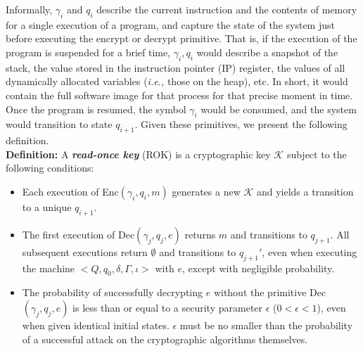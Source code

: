 Informally, $\gamma_i$ and $q_i$ describe the current instruction and the contents of memory for a single execution
of a program, and capture the state of the system just before executing the encrypt or decrypt primitive.  That is,
if the execution of the program is suspended for a brief time, $\gamma_i,q_i$ would describe a snapshot of the
stack, the value stored in the instruction pointer (IP) register, the values of all dynamically allocated
variables (\emph{i.e.,} those on the heap), etc.  In short, it would contain the full software image for that
process for that precise moment in time.  Once the program is resumed, the symbol $\gamma_i$ would be consumed, and
the system would transition to state $q_{i+1}$.  Given these primitives, we present the following definition. \\

\noindent \textbf{Definition:}  A \emph{\bf read-once key} (ROK) is a cryptographic key $\mathcal{K}$ subject
to the following conditions:
\begin{itemize}
\item Each execution of {\sf Enc}$(\gamma_i,q_i,m)$ generates a new $\mathcal{K}$ and yields a transition to a unique $q_{i+1}$.
\item The first execution of {\sf Dec}$(\gamma_j,q_j,e)$ returns $m$ and transitions to $q_{j+1}$.  All subsequent executions
return $\emptyset$ and transitions to $q_{j+1}'$, even when executing the machine $< Q,q_0,\delta,\Gamma,\iota >$ with $e$,
except with negligible probability.
\item The probability of successfully decrypting $e$ without the primitive {\sf Dec}$(\gamma_j,q_j,e)$ is less than or equal to
a security parameter $\epsilon$ ($0 < \epsilon < 1$), even when given identical initial states.  $\epsilon$ must be no
smaller than the probability of a successful attack on the cryptographic algorithms themselves.
\end{itemize}

